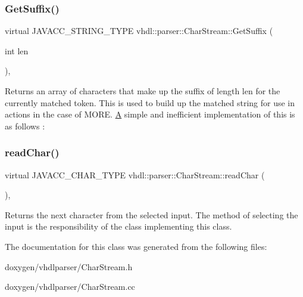 \subsubsection{\texorpdfstring{GetSuffix()}{GetSuffix()}}
{\footnotesize\ttfamily virtual J\+A\+V\+A\+C\+C\+\_\+\+S\+T\+R\+I\+N\+G\+\_\+\+T\+Y\+PE vhdl\+::parser\+::\+Char\+Stream\+::\+Get\+Suffix (\begin{DoxyParamCaption}\item[{int}]{len }\end{DoxyParamCaption})\hspace{0.3cm}{\ttfamily [inline]}, {\ttfamily [virtual]}}

Returns an array of characters that make up the suffix of length \textquotesingle{}len\textquotesingle{} for the currently matched token. This is used to build up the matched string for use in actions in the case of M\+O\+RE. \mbox{\hyperlink{class_a}{A}} simple and inefficient implementation of this is as follows \+: \mbox{\label{classvhdl_1_1parser_1_1_char_stream_a555f81eb2fcb4bafbe692bc3a357d120}} 
\subsubsection{\texorpdfstring{readChar()}{readChar()}}
{\footnotesize\ttfamily virtual J\+A\+V\+A\+C\+C\+\_\+\+C\+H\+A\+R\+\_\+\+T\+Y\+PE vhdl\+::parser\+::\+Char\+Stream\+::read\+Char (\begin{DoxyParamCaption}{ }\end{DoxyParamCaption})\hspace{0.3cm}{\ttfamily [inline]}, {\ttfamily [virtual]}}

Returns the next character from the selected input. The method of selecting the input is the responsibility of the class implementing this class. 

The documentation for this class was generated from the following files\+:\begin{DoxyCompactItemize}
\item 
doxygen/vhdlparser/Char\+Stream.\+h\item 
doxygen/vhdlparser/Char\+Stream.\+cc\end{DoxyCompactItemize}
